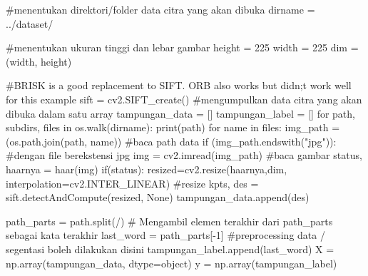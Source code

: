 \documentclass[
  letterpaper,
  DIV=11,
  numbers=noendperiod]{scrreprt}
\newenvironment{Shaded}{\begin{snugshade}}{\end{snugshade}}
\newcommand{\BuiltInTok}[1]{\textcolor[rgb]{0.00,0.23,0.31}{#1}}
\newcommand{\CommentTok}[1]{\textcolor[rgb]{0.37,0.37,0.37}{#1}}
\newcommand{\ControlFlowTok}[1]{\textcolor[rgb]{0.00,0.23,0.31}{#1}}
\newcommand{\DecValTok}[1]{\textcolor[rgb]{0.68,0.00,0.00}{#1}}
\newcommand{\KeywordTok}[1]{\textcolor[rgb]{0.00,0.23,0.31}{#1}}
\newcommand{\NormalTok}[1]{\textcolor[rgb]{0.00,0.23,0.31}{#1}}
\newcommand{\OperatorTok}[1]{\textcolor[rgb]{0.37,0.37,0.37}{#1}}
\newcommand{\StringTok}[1]{\textcolor[rgb]{0.13,0.47,0.30}{#1}}
\newcommand{\VariableTok}[1]{\textcolor[rgb]{0.07,0.07,0.07}{#1}}
\begin{document}
\begin{Shaded}
\begin{Highlighting}[]
\CommentTok{\#menentukan direktori/folder data citra yang akan dibuka}
\NormalTok{dirname }\OperatorTok{=} \StringTok{\textquotesingle{}../dataset/\textquotesingle{}}  

\CommentTok{\#menentukan ukuran tinggi dan lebar gambar}
\NormalTok{height }\OperatorTok{=} \DecValTok{225}
\NormalTok{width }\OperatorTok{=} \DecValTok{225}
\NormalTok{dim }\OperatorTok{=}\NormalTok{ (width, height)}

\CommentTok{\#BRISK is a good replacement to SIFT. ORB also works but didn;t work well for this example  }
\NormalTok{sift }\OperatorTok{=}\NormalTok{ cv2.SIFT\_create()}
\CommentTok{\#mengumpulkan data citra yang akan dibuka dalam satu array}
\NormalTok{tampungan\_data }\OperatorTok{=}\NormalTok{ [] }
\NormalTok{tampungan\_label }\OperatorTok{=}\NormalTok{ []}
\ControlFlowTok{for}\NormalTok{ path, subdirs, files }\KeywordTok{in}\NormalTok{ os.walk(dirname):}
    \BuiltInTok{print}\NormalTok{(path)}
    \ControlFlowTok{for}\NormalTok{ name }\KeywordTok{in}\NormalTok{ files:}
\NormalTok{        img\_path }\OperatorTok{=}\NormalTok{ (os.path.join(path, name))  }\CommentTok{\#baca path data}
        \ControlFlowTok{if}\NormalTok{ (img\_path.endswith(}\StringTok{"jpg"}\NormalTok{)): }\CommentTok{\#dengan file berekstensi jpg}
\NormalTok{            img }\OperatorTok{=}\NormalTok{ cv2.imread(img\_path) }\CommentTok{\#baca gambar}
\NormalTok{            status, haarnya }\OperatorTok{=}\NormalTok{ haar(img)}
            \ControlFlowTok{if}\NormalTok{(status):}
\NormalTok{                resized}\OperatorTok{=}\NormalTok{cv2.resize(haarnya,dim, interpolation}\OperatorTok{=}\NormalTok{cv2.INTER\_LINEAR) }\CommentTok{\#resize}
\NormalTok{                kpts, des }\OperatorTok{=}\NormalTok{ sift.detectAndCompute(resized, }\VariableTok{None}\NormalTok{)}
\NormalTok{                tampungan\_data.append(des)}
                
\NormalTok{                path\_parts }\OperatorTok{=}\NormalTok{ path.split(}\StringTok{\textquotesingle{}/\textquotesingle{}}\NormalTok{)}
                \CommentTok{\# Mengambil elemen terakhir dari path\_parts sebagai kata terakhir}
\NormalTok{                last\_word }\OperatorTok{=}\NormalTok{ path\_parts[}\OperatorTok{{-}}\DecValTok{1}\NormalTok{]}
                \CommentTok{\#preprocessing data / segentasi  boleh dilakukan disini}
\NormalTok{                tampungan\_label.append(last\_word)}
\NormalTok{    X }\OperatorTok{=}\NormalTok{ np.array(tampungan\_data, dtype}\OperatorTok{=}\BuiltInTok{object}\NormalTok{) }
\NormalTok{    y }\OperatorTok{=}\NormalTok{ np.array(tampungan\_label) }
\end{Highlighting}
\end{Shaded}
\end{document}
